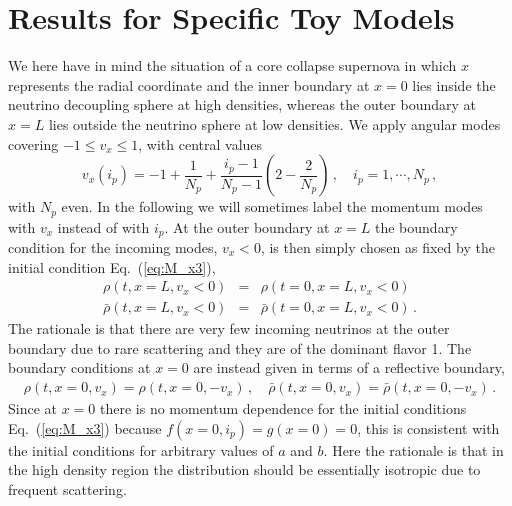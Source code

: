 \documentclass[prd,aps]{revtex4-2}
\begin{document}
\section{Results for Specific Toy Models} \label{sec:sec3}
We here have in mind the situation of a core collapse supernova in which $x$ represents the radial coordinate and
the inner boundary at $x=0$ lies inside the neutrino decoupling sphere at high densities, whereas the outer boundary at $x=L$
lies outside the neutrino sphere at low densities.
We apply angular modes covering $-1\leq v_x\leq1$, with central values
\begin{equation}\label{eq:v_x}
v_x(i_p)=-1+\frac{1}{N_p}+\frac{i_p-1}{N_p-1}\left(2-\frac{2}{N_p}\right)\,,\quad i_p=1,\cdots,N_p\,,
\end{equation}
with $N_p$ even. In the following we will sometimes label the momentum modes with $v_x$ instead of with $i_p$.
At the outer boundary at $x=L$ the boundary condition for the incoming modes, $v_x<0$, is then simply chosen as fixed by
the initial condition Eq.~(\ref{eq:M_x3}),
\begin{eqnarray}
  \rho(t,x=L,v_x<0)&=&\rho(t=0,x=L,v_x<0)\label{eq:M_init2a}\\
  \bar\rho(t,x=L,v_x<0)&=&\bar\rho(t=0,x=L,v_x<0)\,.\nonumber
\end{eqnarray}
The rationale is that there are very few incoming neutrinos at the outer boundary due to rare scattering
and they are of the dominant flavor 1. The boundary conditions at $x=0$ are instead given in terms of a reflective boundary,
\begin{eqnarray}\label{eq:M_init2b}
  \rho(t,x=0,v_x)=\rho(t,x=0,-v_x)\,,\quad\bar\rho(t,x=0,v_x)=\bar\rho(t,x=0,-v_x)\,.
\end{eqnarray}
Since at $x=0$ there is no momentum dependence for the initial conditions Eq.~(\ref{eq:M_x3}) because $f(x=0,i_p)=g(x=0)=0$,
this is consistent with the initial conditions for arbitrary values of $a$ and $b$. Here the rationale is that in the high density region
the distribution should be essentially isotropic due to frequent scattering.
\end{document}
